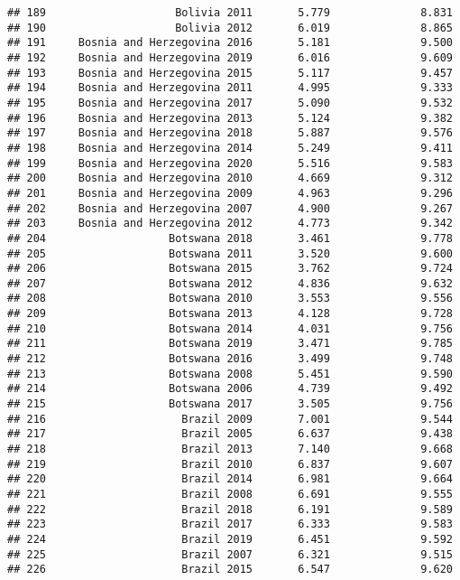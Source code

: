 \documentclass[
]{article}
\begin{document}
\begin{verbatim}
## 189                    Bolivia 2011       5.779              8.831
## 190                    Bolivia 2012       6.019              8.865
## 191     Bosnia and Herzegovina 2016       5.181              9.500
## 192     Bosnia and Herzegovina 2019       6.016              9.609
## 193     Bosnia and Herzegovina 2015       5.117              9.457
## 194     Bosnia and Herzegovina 2011       4.995              9.333
## 195     Bosnia and Herzegovina 2017       5.090              9.532
## 196     Bosnia and Herzegovina 2013       5.124              9.382
## 197     Bosnia and Herzegovina 2018       5.887              9.576
## 198     Bosnia and Herzegovina 2014       5.249              9.411
## 199     Bosnia and Herzegovina 2020       5.516              9.583
## 200     Bosnia and Herzegovina 2010       4.669              9.312
## 201     Bosnia and Herzegovina 2009       4.963              9.296
## 202     Bosnia and Herzegovina 2007       4.900              9.267
## 203     Bosnia and Herzegovina 2012       4.773              9.342
## 204                   Botswana 2018       3.461              9.778
## 205                   Botswana 2011       3.520              9.600
## 206                   Botswana 2015       3.762              9.724
## 207                   Botswana 2012       4.836              9.632
## 208                   Botswana 2010       3.553              9.556
## 209                   Botswana 2013       4.128              9.728
## 210                   Botswana 2014       4.031              9.756
## 211                   Botswana 2019       3.471              9.785
## 212                   Botswana 2016       3.499              9.748
## 213                   Botswana 2008       5.451              9.590
## 214                   Botswana 2006       4.739              9.492
## 215                   Botswana 2017       3.505              9.756
## 216                     Brazil 2009       7.001              9.544
## 217                     Brazil 2005       6.637              9.438
## 218                     Brazil 2013       7.140              9.668
## 219                     Brazil 2010       6.837              9.607
## 220                     Brazil 2014       6.981              9.664
## 221                     Brazil 2008       6.691              9.555
## 222                     Brazil 2018       6.191              9.589
## 223                     Brazil 2017       6.333              9.583
## 224                     Brazil 2019       6.451              9.592
## 225                     Brazil 2007       6.321              9.515
## 226                     Brazil 2015       6.547              9.620

\end{verbatim}
\end{document}
